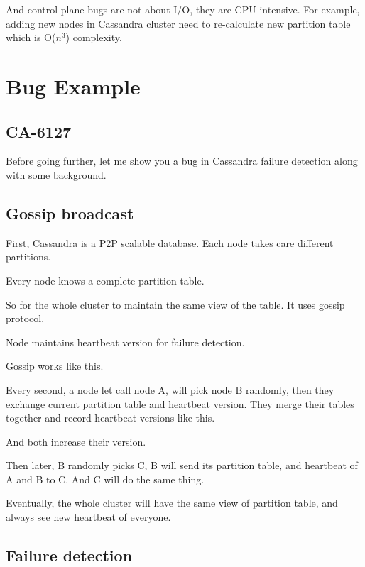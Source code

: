 And control plane bugs are not about I/O, they are CPU intensive. For example,
adding new nodes in Cassandra cluster need to re-calculate new partition table
which is O($n^3$) complexity.

\section{Bug Example}


\subsection{CA-6127}

Before going further, let me show you a bug in Cassandra failure detection along
with some background.

\subsection{Gossip broadcast}

First, Cassandra is a P2P scalable database. Each node takes care different
partitions.

Every node knows a complete partition table.

So for the whole cluster to maintain the same view of the table. It uses gossip
protocol.

Node maintains heartbeat version for failure detection.

Gossip works like this.

Every second, a node let call node A, will pick node B randomly, then they
exchange current partition table and heartbeat version. They merge their tables
together and record heartbeat versions like this.

And both increase their version.


Then later, B randomly picks C, B will send its partition table, and heartbeat
of A and B to C. And C will do the same thing.

Eventually, the whole cluster will have the same view of partition table, and
always see new heartbeat of everyone.

\subsection{Failure detection}


